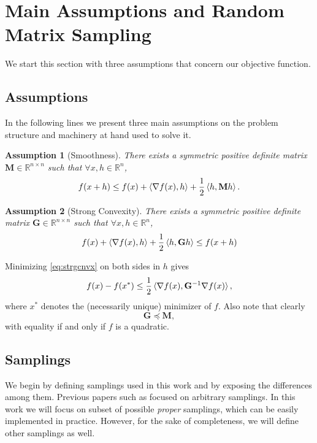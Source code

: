 \documentclass[11pt]{article}
\newtheorem{assumption}{Assumption}
\begin{document}
		
		

\section{Main Assumptions and Random Matrix Sampling}
We start this section with three assumptions that concern our objective function.

\subsection{Assumptions}
In the following lines we present three main assumptions on the problem structure and machinery at hand used to solve it.
\begin{assumption}[Smoothness]\label{ass:smooth}
	There exists a symmetric positive definite matrix $\mathbf{M} \in \mathbb{R}^{n \times n}$ such that $\forall x,h \in \mathbb{R}^n$,
	\begin{equation}\label{eq:smooth}
	f(x+h)\leq f(x)+\braket{\nabla f(x),h}+\frac{1}{2}\braket{h,\mathbf{M}h}.
	\end{equation}
\end{assumption}

\begin{assumption}[Strong Convexity]\label{ass:strongconvex}
	There exists a symmetric positive definite matrix $\mathbf{G} \in \mathbb{R}^{n \times n}$ such that $\forall x,h \in \mathbb{R}^n$,
	\begin{equation}\label{eq:strgcnvx}
	f(x)+\braket{\nabla f(x),h}+\frac{1}{2}\braket{h,\mathbf{G}h}\leq f(x+h)
	\end{equation}
\end{assumption}
	Minimizing \eqref{eq:strgcnvx} on both sides in $h$ gives
	\begin{equation}\label{eq:strgcnvx2}
	f(x)-f(x^*)\leq\frac{1}{2}\braket{\nabla f(x),\mathbf{G}^{-1}\nabla f(x)},
	\end{equation}
	where $x^*$ denotes the (necessarily unique) minimizer of $f$. Also note that clearly
	\begin{equation}\label{eq:ordering}
	\mathbf{G} \preceq \mathbf{M},
	\end{equation}
	with equality if and only if $f$ is a quadratic.

\subsection{Samplings}
We begin by defining samplings used in this work and by exposing the differences among them. Previous papers such as \cite{ESO, QUARTZ, NSYNC} focused on arbitrary samplings. In this work we will focus on subset of possible \emph{proper} samplings, which can be easily implemented in practice. However, for the sake of completeness, we will define other samplings as well. 
\end{document}
